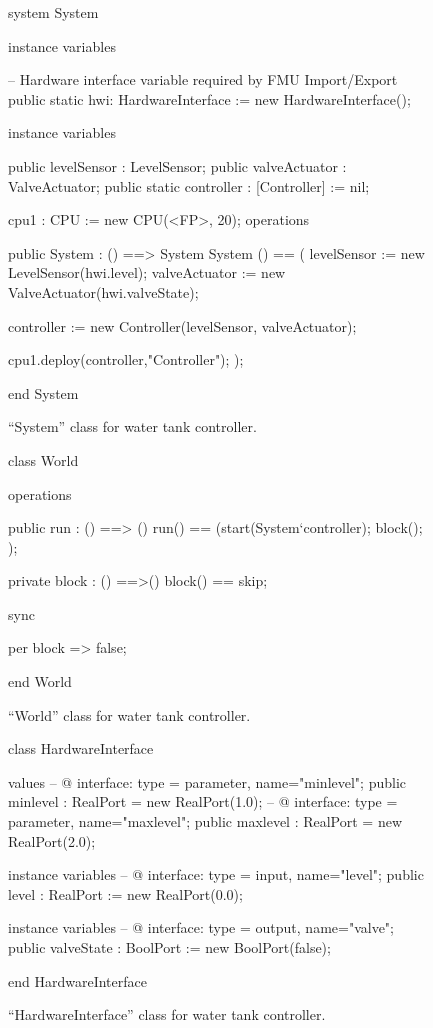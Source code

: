 %
%
%
\begin{figure}[ht]
\begin{vdmrt}
system System

instance variables

-- Hardware interface variable required by FMU Import/Export
public static hwi: HardwareInterface := new HardwareInterface();
    

instance variables

  public levelSensor : LevelSensor;
  public valveActuator : ValveActuator;
  public static controller : [Controller] := nil;

	cpu1 : CPU := new CPU(<FP>, 20);
operations

public System : () ==> System
System () == 
(
	levelSensor := new LevelSensor(hwi.level);
	valveActuator :=  new ValveActuator(hwi.valveState); 
	
	controller := new Controller(levelSensor, valveActuator);

	cpu1.deploy(controller,"Controller");
);

end System
\end{vdmrt}
\caption{``System'' class for water tank controller.}
\label{lst:wtSystem}
\end{figure}
%
%
%
\begin{figure}[ht]
\begin{vdmrt}
class World

operations

public run : () ==> ()
run() ==
 (start(System`controller);
  block();
 );

private block : () ==>()
block() ==
  skip;

sync

  per block => false;

end World
\end{vdmrt}
\caption{``World'' class for water tank controller.}
\label{lst:wtWorld}
\end{figure}
%
%
%
\begin{figure}[ht]
\begin{vdmrt}
class HardwareInterface

values
	-- @ interface: type = parameter, name="minlevel";
	public minlevel : RealPort = new RealPort(1.0);
	-- @ interface: type = parameter, name="maxlevel";
	public maxlevel : RealPort = new RealPort(2.0);

instance variables
	-- @ interface: type = input, name="level";
	public level : RealPort := new RealPort(0.0);

instance variables
	-- @ interface: type = output, name="valve";
	public valveState : BoolPort := new BoolPort(false);

end HardwareInterface
\end{vdmrt}
\caption{``HardwareInterface'' class for water tank controller.}
\label{lst:wtHWInterface}
\end{figure}
